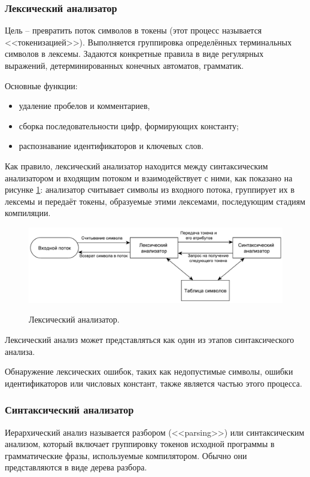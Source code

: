\subsubsection{Лексический анализатор}
Цель -- превратить поток символов в токены (этот процесс называется <<токенизацией>>). Выполняется группировка определённых терминальных символов в лексемы. Задаются конкретные правила в виде регулярных выражений, детерминированных конечных автоматов, грамматик. 

Основные функции:
\begin{itemize}
	\item удаление пробелов и комментариев, 
	
	\item сборка последовательности цифр, формирующих константу;
	
	\item распознавание идентификаторов и ключевых слов.
\end{itemize}

Как правило, лексический анализатор находится между синтаксическим анализатором и входящим потоком и взаимодействует с ними, как показано на рисунке \ref{fig:lexer}: анализатор считывает символы из входного потока, группирует их в лексемы и передаёт токены, образуемые этими лексемами, последующим стадиям компиляции.

\begin{figure}[h!]
	\begin{center}
		{\includegraphics[scale = 0.55, page=1]{img/lexer.pdf}}
		\caption{Лексический анализатор.}
		\label{fig:lexer}
	\end{center}
\end{figure}

Лексический анализ может представляться как один из этапов синтаксического анализа. 

Обнаружение лексических ошибок, таких как недопустимые символы, ошибки идентификаторов или числовых констант, также является частью этого процесса. \\

\subsubsection{Синтаксический анализатор}
Иерархический анализ называется разбором (<<parsing>>) или синтаксическим анализом, который включает группировку токенов исходной программы в грамматические фразы, используемые компилятором. Обычно они представляются в виде дерева разбора.

